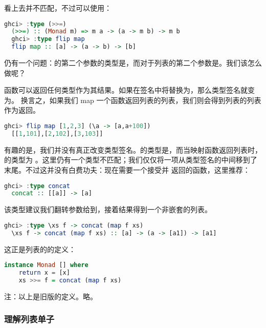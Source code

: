 \documentclass[./main.tex]{subfiles}
\begin{document}
看上去并不匹配，不过可以使用：

\begin{lstlisting}[language=Haskell]
  ghci> :type (>>=)
  (>>=) :: (Monad m) => m a -> (a -> m b) -> m b
  ghci> :type flip map
  flip map :: [a] -> (a -> b) -> [b]
\end{lstlisting}

仍有一个问题：的第二个参数的类型是，而\acode{(>>=)}对于列表的第二个参数是。我们该怎么做呢？

函数可以返回任何类型作为其结果。如果在签名中将替换为\acode{[b]}，那么类型签名就变为。
换言之，如果我们 map 一个函数返回列表的列表，我们则会得到列表的列表作为返回。

\begin{lstlisting}[language=Haskell]
  ghci> flip map [1,2,3] (\a -> [a,a+100])
  [[1,101],[2,102],[3,103]]
\end{lstlisting}

有趣的是，我们并没有真正改变类型签名。\acode{(>>=)}的类型是，而当映射函数返回列表时，的类型为
。这里仍有一个类型不匹配；我们仅仅将一项从类型签名的中间移到了末尾。不过这并没有白费功夫：现在需要一个接受\acode{[[b]]}并
返回\acode{[b]}的函数，这里推荐：

\begin{lstlisting}[language=Haskell]
  ghci> :type concat
  concat :: [[a]] -> [a]
\end{lstlisting}

该类型建议我们翻转参数给到，接着结果得到一个非嵌套的列表。

\begin{lstlisting}[language=Haskell]
  ghci> :type \xs f -> concat (map f xs)
  \xs f -> concat (map f xs) :: [a] -> (a -> [a1]) -> [a1]
\end{lstlisting}

这正是列表的\acode{(>>=)}的定义：

\begin{lstlisting}[language=Haskell]
  instance Monad [] where
    return x = [x]
    xs >>= f = concat (map f xs)
\end{lstlisting}

注：以上是旧版的定义。略。

\subsubsection*{理解列表单子}
\end{document}
